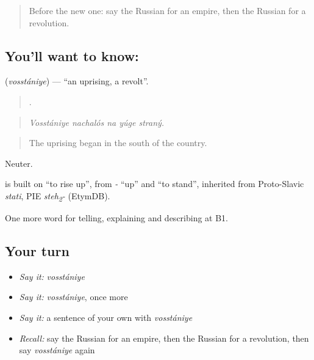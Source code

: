 \label{lesson:RU-C325-vosstaniye}



\begin{quote}
Before the new one: say the Russian for an empire, then the Russian for a revolution.
\end{quote}

\subsection*{You'll want to know: }
\textbf{} (\emph{vosstániye}) — \textquotedblleft{}an uprising, a revolt\textquotedblright{}.

\begin{quote}
    .
\end{quote}

\begin{quote}
\emph{Vosstániye nachalós na yúge straný.}
\end{quote}

\begin{quote}
The uprising began in the south of the country.
\end{quote}

Neuter.

\begin{cousinweb}
\emph{} is built on \emph{} \textquotedblleft{}to rise up\textquotedblright{}, from \emph{-} \textquotedblleft{}up\textquotedblright{} and \emph{} \textquotedblleft{}to stand\textquotedblright{}, inherited from Proto-Slavic \emph{stati}, PIE \emph{steh\textsubscript{2}-} (EtymDB).
\end{cousinweb}

\begin{grammarlens}[title={What you've built}]
One more word for telling, explaining and describing at B1.
\end{grammarlens}

\subsection*{Your turn}
\begin{itemize}
\raggedright
  \item \emph{Say it:} \emph{vosstániye}
  \item \emph{Say it:} \emph{vosstániye}, once more
  \item \emph{Say it:} a sentence of your own with \emph{vosstániye}
  \item \emph{Recall:} say the Russian for an empire, then the Russian for a revolution, then say \emph{vosstániye} again
\end{itemize}

